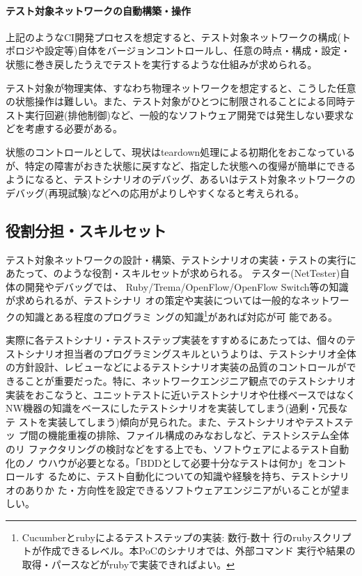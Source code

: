     \paragraph{テスト対象ネットワークの自動構築・操作}
上記のようなCI開発プロセスを想定すると、テスト対象ネットワークの構成(ト
ポロジや設定等)自体をバージョンコントロールし、任意の時点・構成・設定・
状態に巻き戻したうえでテストを実行するような仕組みが求められる。

テスト対象が物理実体、すなわち物理ネットワークを想定すると、こうした任意
の状態操作は難しい。また、テスト対象がひとつに制限されることによる同時テ
スト実行回避(排他制御)など、一般的なソフトウェア開発では発生しない要求な
どを考慮する必要がある。

状態のコントロールとして、現状はteardown処理による初期化をおこなっている
が、特定の障害がおきた状態に戻すなど、指定した状態への復帰が簡単にできる
ようになると、テストシナリオのデバッグ、あるいはテスト対象ネットワークの
デバッグ(再現試験)などへの応用がよりしやすくなると考えられる。

  \subsection{役割分担・スキルセット}

テスト対象ネットワークの設計・構築、テストシナリオの実装・テストの実行に
あたって、のような役割・スキルセットが求められる。
テスター(NetTester)自体の開発やデバッグでは、
Ruby/Trema/OpenFlow/OpenFlow Switch等の知識が求められるが、テストシナリ
オの策定や実装については一般的なネットワークの知識とある程度のプログラミ
ングの知識\footnote{Cucumberとrubyによるテストステップの実装: 数行-数十
行のrubyスクリプトが作成できるレベル。本PoCのシナリオでは、外部コマンド
実行や結果の取得・パースなどがrubyで実装できればよい。}があれば対応が可
能である。

実際に各テストシナリ・テストステップ実装をすすめるにあたっては、個々のテ
ストシナリオ担当者のプログラミングスキルというよりは、テストシナリオ全体
の方針設計、レビューなどによるテストシナリオ実装の品質のコントロールがで
きることが重要だった。特に、ネットワークエンジニア観点でのテストシナリオ
実装をおこなうと、ユニットテストに近いテストシナリオや仕様ベースではなく
NW機器の知識をベースにしたテストシナリオを実装してしまう(過剰・冗長なテ
ストを実装してしまう)傾向が見られた。また、テストシナリオやテストステッ
プ間の機能重複の排除、ファイル構成のみなおしなど、テストシステム全体のリ
ファクタリングの検討などをする上でも、ソフトウェアによるテスト自動化のノ
ウハウが必要となる。「BDDとして必要十分なテストは何か」をコントロールす
るために、テスト自動化についての知識や経験を持ち、テストシナリオのありか
た・方向性を設定できるソフトウェアエンジニアがいることが望ましい。

